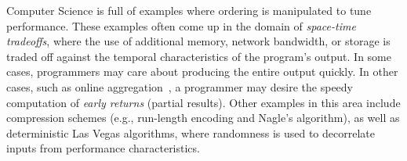 Computer Science is full of examples where ordering is manipulated to tune performance.  These
examples often come up in the domain of {\em space-time tradeoffs}, where the use of additional
memory, network bandwidth, or storage is traded off against the temporal characteristics of the
program's output.  In some cases, programmers may care about producing the entire output quickly.
In other cases, such as online aggregation~\cite{Hellerstein1997}, a programmer may desire the speedy computation of
{\em early returns} (partial results).  Other examples in this area include compression schemes
(e.g., run-length encoding and Nagle's algorithm), as well as deterministic Las Vegas algorithms,
where randomness is used to decorrelate inputs from performance characteristics.
